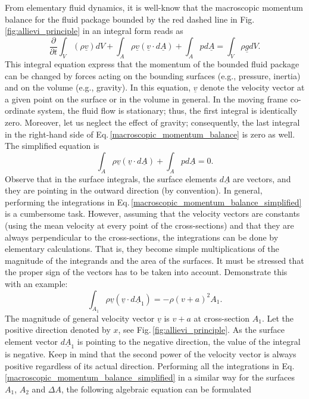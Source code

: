 From elementary fluid dynamics, it is well-know that the macroscopic momentum balance for the fluid package bounded by the red dashed line in Fig.\,\ref{fig:allievi_principle} in an integral form reads as
%
\begin{equation} \label{macroscopic_momentum_balance}
\frac{\partial}{\partial t} \int_V \left(\rho \underline{v} \right) dV + \int_A \rho \underline{v} \left( \underline{v} \cdot d\underline{A} \right) + \int_A p d\underline{A} = \int_V \rho \underline{g} dV.
\end{equation}
%
This integral equation express that the momentum of the bounded fluid package can be changed by forces acting on the bounding surfaces (e.g., pressure, inertia) and on the volume (e.g., gravity). In this equation, $\underline{v}$ denote the velocity vector at a given point on the surface or in the volume in general. In the moving frame co-ordinate system, the fluid flow is stationary; thus, the first integral is identically zero. Moreover, let us neglect the effect of gravity; consequently, the last integral in the right-hand side of Eq.\,\eqref{macroscopic_momentum_balance} is zero as well. The simplified equation is
%
\begin{equation} \label{macroscopic_momentum_balance_simplified}
\int_A \rho \underline{v} \left( \underline{v} \cdot d\underline{A} \right) + \int_A p d\underline{A} = 0.
\end{equation}
%
Observe that in the surface integrals, the surface elements $d\underline{A}$ are vectors, and they are pointing in the outward direction (by convention). In general, performing the integrations in Eq.\,\eqref{macroscopic_momentum_balance_simplified} is a cumbersome task. However, assuming that the velocity vectors are constants (using the mean velocity at every point of the cross-sections) and that they are always perpendicular to the cross-sections, the integrations can be done by elementary calculations. That is, they become simple multiplications of the magnitude of the integrands and the area of the surfaces. It must be stressed that the proper sign of the vectors has to be taken into account. Demonstrate this with an example:
%
\begin{equation}
\int_{A_1} \rho \underline{v} \left( \underline{v} \cdot d\underline{A}_1 \right) = - \rho \left( v+a \right)^2 A_1.
\end{equation}
%
The magnitude of general velocity vector $\underline{v}$ is $v+a$ at cross-section $A_1$. Let the positive direction denoted by $x$, see Fig.\,\ref{fig:allievi_principle}. As the surface element vector $d\underline{A}_1$ is pointing to the negative direction, the value of the integral is negative. Keep in mind that the second power of the velocity vector is always positive regardless of its actual direction. Performing all the integrations in Eq.\,\ref{macroscopic_momentum_balance_simplified} in a similar way for the surfaces $A_1$, $A_2$ and $\Delta A$, the following algebraic equation can be formulated
